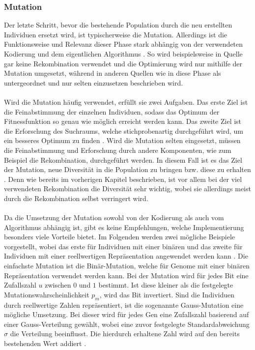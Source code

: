 \subsubsection{Mutation}
\label{subsubsec:ea_mutation}
Der letzte Schritt, bevor die bestehende Population durch die neu erstellten Individuen ersetzt wird, ist typischerweise die Mutation. Allerdings ist die Funktionsweise und Relevanz dieser Phase stark abhängig von der verwendeten Kodierung und dem eigentlichen Algorithmus \cite{weicker2015evolutionare}. So wird beispielsweise in Quelle \cite{such2017deep} gar keine Rekombination verwendet und die Optimierung wird nur mithilfe der Mutation umgesetzt, während in anderen Quellen wie in \cite{zoller2007kunstliche} diese Phase als untergeordnet und nur selten einzusetzen beschrieben wird.
\\\\
Wird die Mutation häufig verwendet, erfüllt sie zwei Aufgaben. Das erste Ziel ist die Feinabstimmung der einzelnen Individuen, sodass das Optimum der Fitnessfunktion so genau wie möglich erreicht werden kann. Das zweite Ziel ist die Erforschung des Suchraums, welche stichprobenartig durchgeführt wird, um ein besseres Optimum zu finden \cite{weicker2015evolutionare}.  Wird die Mutation selten eingesetzt, müssen die Feinabstimmung und Erforschung durch andere Komponenten, wie zum Beispiel die Rekombination, durchgeführt werden. In diesem Fall ist es das Ziel der Mutation, neue Diversität in die Population zu bringen bzw. diese zu erhalten \cite{weicker2015evolutionare}. Denn wie bereits im vorherigen Kapitel beschrieben, ist vor allem bei der viel verwendeten Rekombination die Diversität sehr wichtig, wobei sie allerdings meist durch die Rekombination selbst verringert wird.
\\\\
Da die Umsetzung der Mutation sowohl von der Kodierung als auch vom Algorithmus abhängig ist, gibt es keine Empfehlungen, welche Implementierung besonders viele Vorteile bietet. Im Folgenden werden zwei mögliche Beispiele vorgestellt, wobei das erste für Individuen mit einer binären und das zweite für Individuen mit einer reellwertigen Repräsentation angewendet werden kann \cite{weicker2015evolutionare}. Die einfachste Mutation ist die Binär-Mutation, welche für Genome mit einer binären Repräsentation verwendet werden kann. Bei der Mutation wird für jedes Bit eine Zufallszahl $u$ zwischen $0$ und $1$ bestimmt. Ist diese kleiner als die festgelegte Mutationswahrscheinlichkeit $p_m$, wird das Bit invertiert. Sind die Individuen durch reellwertige Zahlen repräsentiert, ist die sogenannte Gauss-Mutation eine mögliche Umsetzung. Bei dieser wird für jedes Gen eine Zufallszahl basierend auf einer Gauss-Verteilung gewählt, wobei eine zuvor festgelegte Standardabweichung $\sigma$ die Verteilung beeinflusst. Die hierdurch erhaltene Zahl wird auf den bereits bestehenden Wert addiert \cite{weicker2015evolutionare}.

